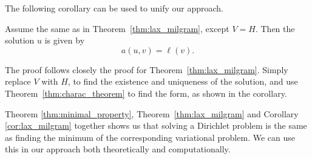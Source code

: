 The following corollary can be used to unify our approach.
\begin{kor}{\quad}
   Assume the same as in Theorem~\ref{thm:lax_milgram}, except $V=H$. Then 
   the solution $u$ is given by~\label{cor:lax_milgram}
   \begin{equation*}
    a(u,v) = \ell(v).
   \end{equation*}
   \vspace{-8mm}
\end{kor}
\begin{bev}
    The proof follows closely the proof for Theorem~\ref{thm:lax_milgram}. 
    Simply replace $V$ with $H$, to find the existence and uniqueness of the 
    solution, and use Theorem~\ref{thm:charac_theorem} to find the form, as 
    shown in the corollary.
\end{bev}
Theorem \ref{thm:minimal_property}, Theorem~\ref{thm:lax_milgram} and Corollary 
\ref{cor:lax_milgram} together shows us that solving a Dirichlet problem is 
the same as finding the minimum of the corresponding variational problem. 
We can use this in our approach both theoretically and computationally.